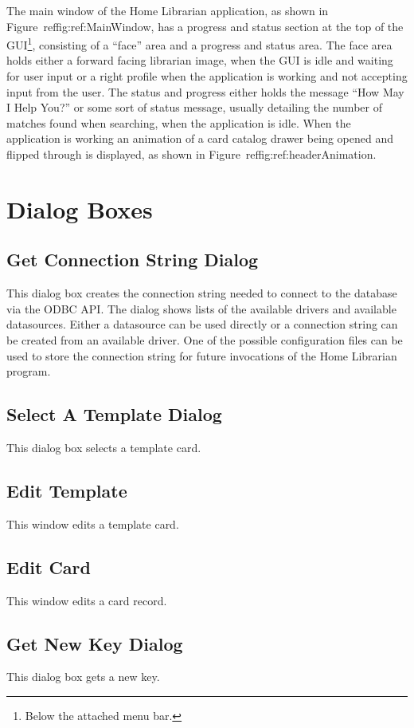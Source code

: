 The main window of the Home Librarian application, as shown in
Figure~ref{fig:ref:MainWindow}, has a progress and status section at
the top of the GUI\footnote{Below the attached menu bar.}, consisting
of a ``face'' area and a progress and status area. The face area holds
either a forward facing librarian image, when the GUI is idle and
waiting for user input or a right profile when the application is
working and not accepting input from the user. The status and progress
either holds the message ``How May I Help You?'' or some sort of status
message, usually detailing the number of matches found when searching,
when the application is idle. When the application is working an
animation of a card catalog drawer being opened and flipped through is
displayed, as shown in Figure~ref{fig:ref:headerAnimation}.






\section{Dialog Boxes}
\subsection{Get Connection String Dialog}
This dialog box creates the connection string needed to connect to the
database via the ODBC API. The dialog shows lists of the available
drivers and available datasources.  Either a datasource can be used
directly or a connection string can be created from an available
driver. One of the possible configuration files can be used to store
the connection string for future invocations of the Home Librarian
program.
\subsection{Select A Template Dialog}
This dialog box selects a template card.
\subsection{Edit Template}
This window edits a template card.
\subsection{Edit Card}
This window edits a card record.
\subsection{Get New Key Dialog}
This dialog box gets a new key.

